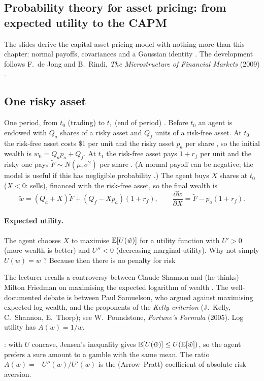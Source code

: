 \begin{paracol}{2}
\section{Probability theory for asset pricing: from expected utility to the CAPM}\label{ch03:sec-capm}

The slides  derive the capital asset pricing model with nothing more than this chapter:
normal payoffs, covariances and a Gaussian identity . The development follows F.~de Jong and
B.~Rindi, \emph{The Microstructure of Financial Markets} (2009) .

\subsection{One risky asset}
One period, from $t_0$ (trading) to $t_1$ (end of period) . Before $t_0$ an agent is endowed
with $Q_a$ shares of a risky asset and $Q_f$ units of a risk-free asset. At $t_0$ the risk-free asset costs \$1 per
unit and the risky asset $p_a$ per share , so the initial wealth is $w_0=Q_ap_a+Q_f$. At $t_1$ the
risk-free asset pays $1+r_f$ per unit and the risky one pays $\tilde F\sim N(\mu,\sigma^2)$ per share .
(A normal payoff can be negative; the model is useful if this has negligible probability .)
The agent buys $X$ shares at $t_0$ ($X<0$: sells), financed with the risk-free asset, so the final wealth is
\begin{equation}\label{ch03:eq-wealth}
  \tilde w=(Q_a+X)\tilde F+(Q_f-Xp_a)(1+r_f),\qquad \frac{\partial\tilde w}{\partial X}=\tilde F-p_a(1+r_f).
\end{equation}

\paragraph{Expected utility.} The agent chooses $X$ to maximise $\mathbb{E}[U(\tilde w)]$ for a utility function with
$U'>0$  (more wealth is better) and $U''<0$  (decreasing marginal utility). Why not
simply $U(w)=w$ ? Because then there is no penalty for risk \begin{coursenote}
The lecturer recalls a controversy between Claude Shannon and (he thinks) Milton Friedman on maximising the
expected logarithm of wealth . The well-documented debate is between Paul Samuelson, who argued
against maximising expected log-wealth, and the proponents of the \emph{Kelly criterion} (J.~Kelly,
C.~Shannon, E.~Thorp); see W.~Poundstone, \emph{Fortune's Formula} (2005). Log utility has $A(w)=1/w$.
\end{coursenote}: with $U$ concave,
Jensen's inequality gives $\mathbb{E}[U(\tilde w)]\le U(\mathbb{E}[\tilde w])$, so the agent prefers a sure amount to a gamble with the
same mean. The ratio $A(w)=-U''(w)/U'(w)$ is the (Arrow--Pratt) coefficient of absolute risk aversion.


\end{paracol}
